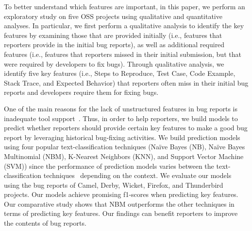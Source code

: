 \documentclass[conference]{IEEEtran}
\begin{document}
To better understand which features are important, in this paper, we perform an exploratory study on five OSS projects using qualitative and quantitative analyses. In particular, we first perform a qualitative analysis to identify the key features by examining those that are provided initially (i.e., features that reporters provide in the initial bug reports), as well as additional required features (i.e., features that reporters missed in their initial submission, but that were required by developers to fix bugs). Through qualitative analysis, we identify five key features (i.e., Steps to Reproduce, Test Case, Code Example, Stack Trace, and Expected Behavior) that reporters often miss in their initial bug reports and developers require them for fixing bugs.

One of the main reasons for the lack of unstructured features in bug reports is inadequate tool support~\cite{Zimmermann:2012, Breu:2010, Chaparro:2017, github:2016}. Thus, in order to help reporters, we build models to predict whether reporters should provide certain key features to make a good bug report by leveraging historical bug-fixing activities. We build prediction models using four popular text-classification techniques (Na\"ive Bayes (NB), Na\"ive Bayes Multinomial (NBM), K-Nearest Neighbors (KNN), and Support Vector Machine (SVM)) since the performance of prediction models varies between the text-classification techniques~\cite{Yang:2002, Xia:2014} depending on the context. We evaluate our models using the bug reports of Camel, Derby, Wicket, Firefox, and Thunderbird projects. Our models achieve promising f1-scores when predicting key features. Our comparative study shows that NBM outperforms the other techniques in terms of predicting key features. Our findings can benefit reporters to improve the contents of bug reports.
\end{document}
